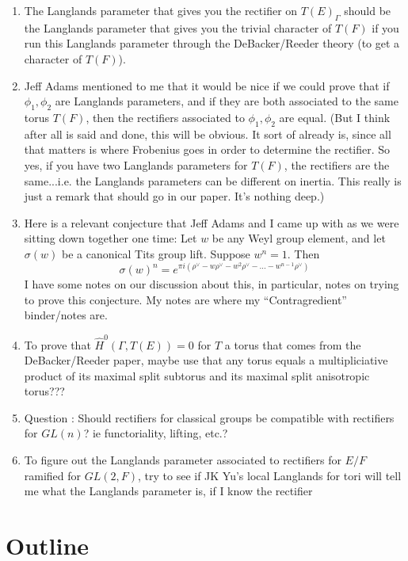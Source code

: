 \documentclass{article}
\begin{document}
\begin{enumerate}
\item The Langlands parameter that gives you the rectifier on $T(E)_{\Gamma}$ should be the Langlands parameter that gives you the trivial character of $T(F)$ if you run this Langlands parameter through the DeBacker/Reeder theory (to get a character of $T(F)$).

\item Jeff Adams mentioned to me that it would be nice if we could prove that if $\phi_1, \phi_2$ are Langlands parameters, and if they are both associated to the same torus $T(F)$, then the rectifiers associated to $\phi_1, \phi_2$ are equal.  (But I think after all is said and done, this will be obvious.  It sort of already is, since all that matters is where Frobenius goes in order to determine the rectifier.  So yes, if you have two Langlands parameters for $T(F)$, the rectifiers are the same...i.e. the Langlands parameters can be different on inertia.  This really is just a remark that should go in our paper.  It's nothing deep.)

\item Here is a relevant conjecture that Jeff Adams and I came up with as we were sitting down together one time: Let $w$ be any Weyl group element, and let $\sigma(w)$ be a canonical Tits group lift.  Suppose $w^n = 1$.  Then $$\sigma(w)^n = e^{\pi i(\rho^{\vee} - w \rho^{\vee} - w^2 \rho^{\vee} - ... - w^{n-1} \rho^{\vee})}$$  I have some notes on our discussion about this, in particular, notes on trying to prove this conjecture.  My notes are where my ``Contragredient'' binder/notes are.

\item To prove that $\hat{H}^0(\Gamma, T(E)) = 0$ for $T$ a torus that comes from the DeBacker/Reeder paper, maybe use that any torus equals a multipliciative product of its maximal split subtorus and its maximal split anisotropic torus???

\item Question : Should rectifiers for classical groups be compatible with rectifiers for $GL(n)$? ie functoriality, lifting, etc.?

\item To figure out the Langlands parameter associated to rectifiers for $E/F$ ramified for $GL(2,F)$, try to see if JK Yu's local Langlands for tori will tell me what the Langlands parameter is, if I know the rectifier


\end{enumerate}

\section{Outline}
\end{document}
